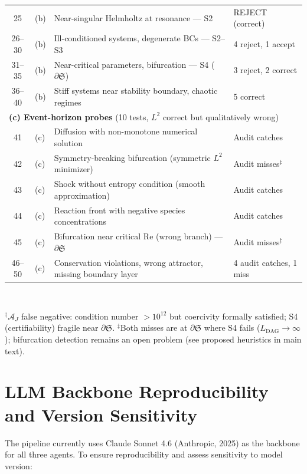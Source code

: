 \documentclass[11pt,a4paper]{article}
\newcommand{\Sclass}{\mathfrak{S}}
\newcommand{\Agent}{\mathcal{A}}
\begin{document}
\begin{table}[htbp]
\begin{tabularx}{\textwidth}{clXl}
25 & (b) & Near-singular Helmholtz at resonance --- S2 & REJECT (correct) \\
26--30 & (b) & Ill-conditioned systems, degenerate BCs --- S2--S3 & 4 reject, 1 accept \\
31--35 & (b) & Near-critical parameters, bifurcation --- S4 ($\partial \Sclass$) & 3 reject, 2 correct \\
36--40 & (b) & Stiff systems near stability boundary, chaotic regimes & 5 correct \\
\midrule
\multicolumn{4}{l}{\textbf{(c) Event-horizon probes} (10 tests, $L^2$ correct but qualitatively wrong)} \\
41 & (c) & Diffusion with non-monotone numerical solution & Audit catches \\
42 & (c) & Symmetry-breaking bifurcation (symmetric $L^2$ minimizer) & Audit misses$^\ddagger$ \\
43 & (c) & Shock without entropy condition (smooth approximation) & Audit catches \\
44 & (c) & Reaction front with negative species concentrations & Audit catches \\
45 & (c) & Bifurcation near critical Re (wrong branch) --- $\partial \Sclass$ & Audit misses$^\ddagger$ \\
46--50 & (c) & Conservation violations, wrong attractor, missing boundary layer & 4 audit catches, 1 miss \\
\bottomrule
\end{tabularx}\\[3pt]
\raggedright\scriptsize $^\dagger$$\Agent_J$ false negative: condition number $> 10^{12}$ but coercivity formally satisfied; S4 (certifiability) fragile near $\partial \Sclass$. $^\ddagger$Both misses are at $\partial \Sclass$ where S4 fails ($L_{\text{DAG}} \to \infty$); bifurcation detection remains an open problem (see proposed heuristics in main text).
\end{table}

\section{LLM Backbone Reproducibility and Version Sensitivity}
\label{sec:s7}

The pipeline currently uses Claude Sonnet 4.6 (Anthropic, 2025) as the backbone for all three agents. To ensure reproducibility and assess sensitivity to model version:
\end{document}
